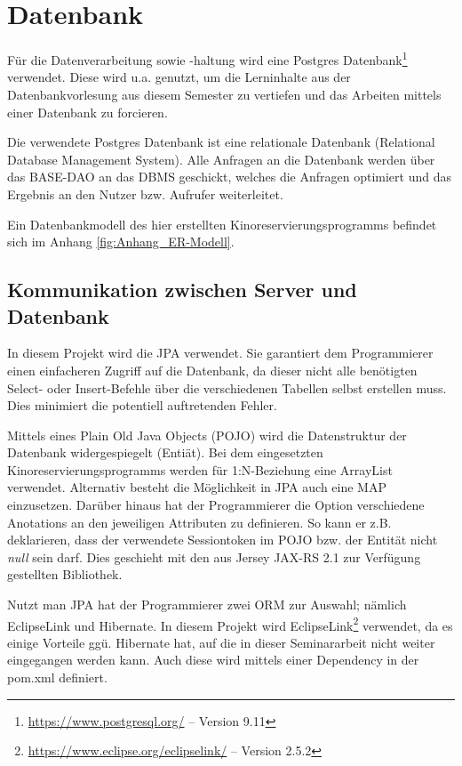 \section{Datenbank}
\label{sec:datenbank}
Für die Datenverarbeitung sowie -haltung wird eine Postgres Datenbank\footnote{\url{https://www.postgresql.org/} -- Version 9.11} verwendet. Diese wird u.a. genutzt, um die Lerninhalte aus der Datenbankvorlesung aus diesem Semester zu vertiefen und das Arbeiten mittels einer Datenbank zu forcieren.  

Die verwendete Postgres Datenbank ist eine relationale Datenbank (Relational Database Management System). Alle Anfragen an die Datenbank werden über das BASE-DAO an das DBMS geschickt, welches die Anfragen optimiert und das Ergebnis an den Nutzer bzw. Aufrufer weiterleitet. 

Ein Datenbankmodell des hier erstellten Kinoreservierungsprogramms befindet sich im Anhang \vref{fig:Anhang_ER-Modell}. 

\subsection{Kommunikation zwischen Server und Datenbank}
\label{ssec:jpa}
In diesem Projekt wird die \ac{JPA} verwendet. Sie garantiert dem Programmierer einen einfacheren Zugriff auf die Datenbank, da dieser nicht alle benötigten Select- oder Insert-Befehle über die verschiedenen Tabellen selbst erstellen muss. Dies minimiert die potentiell auftretenden Fehler. 

Mittels eines Plain Old Java Objects (POJO) wird die Datenstruktur der Datenbank widergespiegelt (Entiät). Bei dem eingesetzten Kinoreservierungsprogramms werden für 1:N-Beziehung eine ArrayList verwendet. Alternativ besteht die Möglichkeit in \ac{JPA} auch eine MAP einzusetzen. Darüber hinaus hat der Programmierer die Option verschiedene Anotations an den jeweiligen Attributen zu definieren. So kann er z.B. deklarieren, dass der verwendete Sessiontoken im POJO bzw. der Entität nicht \textit{null} sein darf. Dies geschieht mit den aus Jersey JAX-RS 2.1 zur Verfügung gestellten Bibliothek.  

Nutzt man \ac{JPA} hat der Programmierer zwei \ac{ORM} zur Auswahl; nämlich EclipseLink und Hibernate. In diesem Projekt wird EclipseLink\footnote{\url{https://www.eclipse.org/eclipselink/} --  Version 2.5.2} verwendet, da es einige Vorteile ggü. Hibernate hat, auf die in dieser Seminararbeit nicht weiter eingegangen werden kann. Auch diese wird mittels einer Dependency in der pom.xml definiert.  

